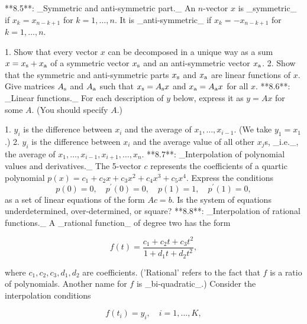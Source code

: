 

**8.5**: _Symmetric and anti-symmetric part._ An \(n\)-vector \(x\) is _symmetric_ if \(x_{k}=x_{n-k+1}\) for \(k=1,\ldots,n\). It is _anti-symmetric_ if \(x_{k}=-x_{n-k+1}\) for \(k=1,\ldots,n\).

1. Show that every vector \(x\) can be decomposed in a unique way as a sum \(x=x_{\rm s}+x_{\rm a}\) of a symmetric vector \(x_{\rm s}\) and an anti-symmetric vector \(x_{\rm a}\).
2. Show that the symmetric and anti-symmetric parts \(x_{\rm s}\) and \(x_{\rm a}\) are linear functions of \(x\). Give matrices \(A_{\rm s}\) and \(A_{\rm a}\) such that \(x_{\rm s}=A_{\rm s}x\) and \(x_{\rm a}=A_{\rm a}x\) for all \(x\).
**8.6**: _Linear functions._ For each description of \(y\) below, express it as \(y=Ax\) for some \(A\). (You should specify \(A\).)

1. \(y_{i}\) is the difference between \(x_{i}\) and the average of \(x_{1},\ldots,x_{i-1}\). (We take \(y_{1}=x_{1}\).)
2. \(y_{i}\) is the difference between \(x_{i}\) and the average value of all other \(x_{j}\)s, _i.e._, the average of \(x_{1},\ldots,x_{i-1},x_{i+1},\ldots,x_{n}\).
**8.7**: _Interpolation of polynomial values and derivatives._ The 5-vector \(c\) represents the coefficients of a quartic polynomial \(p(x)=c_{1}+c_{2}x+c_{3}x^{2}+c_{4}x^{3}+c_{5}x^{4}\). Express the conditions \[p(0)=0,\quad p^{\prime}(0)=0,\quad p(1)=1,\quad p^{\prime}(1)=0,\] as a set of linear equations of the form \(Ac=b\). Is the system of equations underdetermined, over-determined, or square?
**8.8**: _Interpolation of rational functions._ A _rational function_ of degree two has the form

\[f(t)=\frac{c_{1}+c_{2}t+c_{3}t^{2}}{1+d_{1}t+d_{2}t^{2}},\]

where \(c_{1},c_{2},c_{3},d_{1},d_{2}\) are coefficients. ('Rational' refers to the fact that \(f\) is a ratio of polynomials. Another name for \(f\) is _bi-quadratic_.) Consider the interpolation conditions

\[f(t_{i})=y_{i},\quad i=1,\ldots,K,\]

